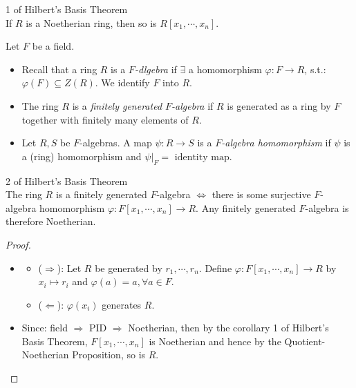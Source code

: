 \begin{corollary}{1 of Hilbert's Basis Theorem}\\
If $R$ is a Noetherian ring, then so is $R [x_1 ,\cdots,x_n]$.
\end{corollary}

\begin{definition}
    Let $F$ be a field.
    \begin{itemize}
        \item Recall that a ring $R$ is a \textit{$F$-dlgebra} if $\exists$ a homomorphism $\varphi: F\to R$, s.t.: $\varphi(F) \subseteq Z(R)$. We identify $F$ into $R$.

        \item The ring $R$ is a \textit{finitely generated $F$-algebra} if $R$ is generated as a ring by $F$ together with finitely many elements of $R$.

        \item Let $R,S$ be $F$-algebras. A map $\psi: R\to S$ is a \textit{$F$-algebra homomorphism} if $\psi$ is a (ring) homomorphism and $\psi|_{F} = \text{ identity map}$.
    \end{itemize}
\end{definition}

\begin{corollary}{2 of Hilbert's Basis Theorem}\\
The ring $R$ is a finitely generated $F$-algebra $\Leftrightarrow$ there is some surjective $F$-algebra homomorphism $\varphi: F[x_1 ,\cdots, x_n] \to R$. Any finitely generated $F$-algebra is therefore Noetherian.
\end{corollary}

\begin{proof}
    \begin{itemize}
        \item \begin{itemize}
            \item ($\Rightarrow$): Let $R$ be generated by $r_1 ,\cdots, r_n$. Define $\varphi: F[x_1 ,\cdots, x_n] \to R$ by $x_i \mapsto r_i$ and $\varphi (a) =a ,\forall a\in F$.

            \item ($\Leftarrow$): $\varphi (x_i)$ generates $R$.
        \end{itemize}

        \item Since: field $\Rightarrow$ PID $\Rightarrow$ Noetherian, then by the corollary 1 of Hilbert's Basis Theorem, $F[x_1 ,\cdots, x_n]$ is Noetherian and hence by the Quotient-Noetherian Proposition, so is $R$.
    \end{itemize}
\end{proof}

